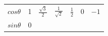 {\begin{tabular}[t]{|l|l|l|l|l|l|l|}
                \begin{math}cos\theta \end{math}
               &
        1 &
                \begin{math}\frac{\sqrt{3}}{2}\end{math}
               &
                \begin{math}\frac{1}{\sqrt{2}}\end{math}
               &
                \begin{math}\frac{1}{2}\end{math}
               &
        0 &
                \begin{math}-1\end{math}
     \tabularnewline\cline{1-1}\cline{2-2}\cline{3-3}\cline{4-4}\cline{5-5}\cline{6-6}\cline{7-7}
                \begin{math}sin\theta \end{math}
               &
        0 &

\end{tabular}}
